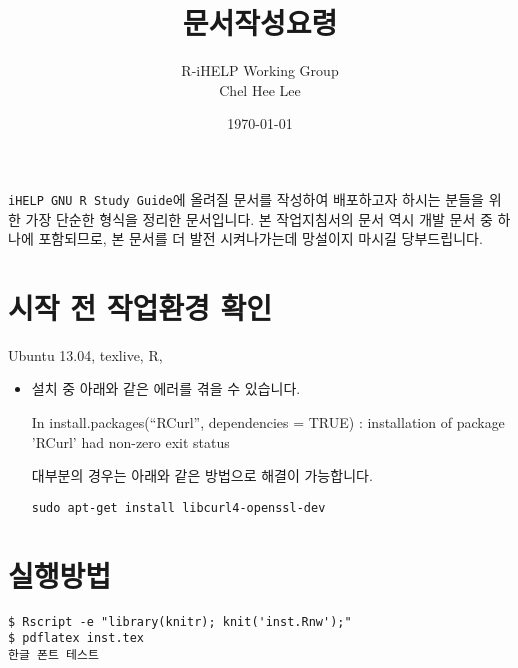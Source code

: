 \documentclass{article}\usepackage{graphicx, color}
\title{문서작성요령}
\author{R-iHELP Working Group \\ Chel Hee Lee}
\date{\today}
\begin{document}
\maketitle

\texttt{iHELP GNU R Study Guide}에 올려질 문서를 작성하여 배포하고자 하시는 분들을 위한 가장 단순한 형식을 정리한 문서입니다. 
본 작업지침서의 문서 역시 개발 문서 중 하나에 포함되므로, 본 문서를 더 발전 시켜나가는데 망설이지 마시길 당부드립니다.

\section{시작 전 작업환경 확인}

Ubuntu 13.04, texlive, R, 

\begin{itemize}
  \item 설치 중 아래와 같은 에러를 겪을 수 있습니다. 

    \begin{Schunk}
      \begin{Sinput}
In install.packages(``RCurl'', dependencies = TRUE) :
  installation of package 'RCurl' had non-zero exit status
      \end{Sinput}
    \end{Schunk}

    대부분의 경우는 아래와 같은 방법으로 해결이 가능합니다. 
    \begin{verbatim}
sudo apt-get install libcurl4-openssl-dev
    \end{verbatim}
    
\end{itemize}


\section{실행방법}

\begin{Verbatim}[fontfamily=rm]
$ Rscript -e "library(knitr); knit('inst.Rnw');"
$ pdflatex inst.tex
한글 폰트 테스트 
\end{Verbatim}
\end{document}
